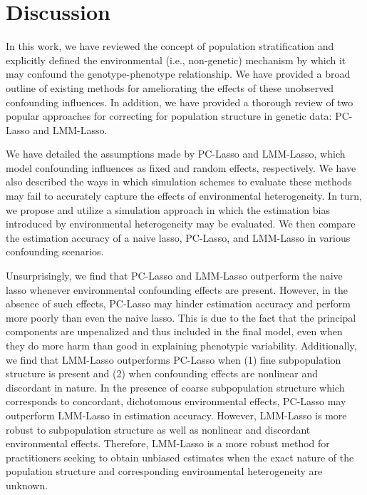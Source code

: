 \section{Discussion} \label{sec:discussion}
In this work, we have reviewed the concept of population stratification and explicitly defined the environmental (i.e., non-genetic) mechanism by which it may confound the genotype-phenotype relationship. We have provided a broad outline of existing methods for ameliorating the effects of these unobserved confounding influences. In addition, we have provided a thorough review of two popular approaches for correcting for population structure in genetic data: PC-Lasso and LMM-Lasso. 

We have detailed the assumptions made by PC-Lasso and LMM-Lasso, which model confounding influences as fixed and random effects, respectively. We have also described the ways in which simulation schemes to evaluate these methods may fail to accurately capture the effects of environmental heterogeneity. In turn, we propose and utilize a simulation approach in which the estimation bias introduced by environmental heterogeneity may be evaluated. We then compare the estimation accuracy of a naive lasso, PC-Lasso, and LMM-Lasso in various confounding scenarios.

Unsurprisingly, we find that PC-Lasso and LMM-Lasso outperform the naive lasso whenever environmental confounding effects are present. However, in the absence of such effects, PC-Lasso may hinder estimation accuracy and perform more poorly than even the naive lasso. This is due to the fact that the principal components are unpenalized and thus included in the final model, even when they do more harm than good in explaining phenotypic variability. Additionally, we find that LMM-Lasso outperforms PC-Lasso when (1) fine subpopulation structure is present and (2) when confounding effects are nonlinear and discordant in nature. In the presence of coarse subpopulation structure which corresponds to concordant, dichotomous environmental effects, PC-Lasso may outperform LMM-Lasso in estimation accuracy. However, LMM-Lasso is more robust to subpopulation structure as well as nonlinear and discordant environmental effects. Therefore, LMM-Lasso is a more robust method for practitioners seeking to obtain unbiased estimates when the exact nature of the population structure and corresponding environmental heterogeneity are unknown.  

